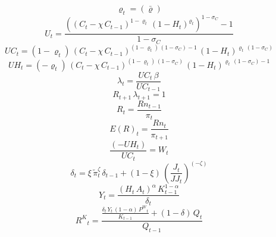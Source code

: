 \begin{dmath}
{{\varrho}}_{t}=(\bar{{\varrho}})
\end{dmath}
\begin{dmath}
{U}_{t}=\frac{\left(\left({C}_{t}-{{\chi}}\, {C}_{t-1}\right)^{1-{{\varrho}}_{t}}\, \left(1-{H}_{t}\right)^{{{\varrho}}_{t}}\right)^{1-{{\sigma_{C}}}}-1}{1-{{\sigma_{C}}}}
\end{dmath}
\begin{dmath}
{UC}_{t}=\left(1-{{\varrho}}_{t}\right)\, \left({C}_{t}-{{\chi}}\, {C}_{t-1}\right)^{\left(1-{{\varrho}}_{t}\right)\, \left(1-{{\sigma_{C}}}\right)-1}\, \left(1-{H}_{t}\right)^{{{\varrho}}_{t}\, \left(1-{{\sigma_{C}}}\right)}
\end{dmath}
\begin{dmath}
{UH}_{t}=\left(-{{\varrho}}_{t}\right)\, \left({C}_{t}-{{\chi}}\, {C}_{t-1}\right)^{\left(1-{{\varrho}}_{t}\right)\, \left(1-{{\sigma_{C}}}\right)}\, \left(1-{H}_{t}\right)^{{{\varrho}}_{t}\, \left(1-{{\sigma_{C}}}\right)-1}
\end{dmath}
\begin{dmath}
{\lambda}_{t}=\frac{{UC}_{t}\, {{\beta}}}{{UC}_{t-1}}
\end{dmath}
\begin{dmath}
{R}_{t+1}\, {\lambda}_{t+1}=1
\end{dmath}
\begin{dmath}
{R}_{t}=\frac{{Rn}_{t-1}}{{\pi}_{t}}
\end{dmath}
\begin{dmath}
{E(R)}_{t}=\frac{{Rn}_{t}}{{\pi}_{t+1}}
\end{dmath}
\begin{dmath}
\frac{\left(-{UH}_{t}\right)}{{UC}_{t}}={W}_{t}
\end{dmath}
\begin{dmath}
{\delta}_{t}={{\xi}}\, {\tilde{\pi}}_{t}^{{{\zeta}}}\, {\delta}_{t-1}+\left(1-{{\xi}}\right)\, \left(\frac{{J}_{t}}{{JJ}_{t}}\right)^{\left(-{{\zeta}}\right)}
\end{dmath}
\begin{dmath}
{Y}_{t}=\frac{\left({H}_{t}\, {A}_{t}\right)^{{{\alpha}}}\, {K}_{t-1}^{1-{{\alpha}}}}{{\delta}_{t}}
\end{dmath}
\begin{dmath}
{R^{K}}_{t}=\frac{\frac{{\delta}_{t}\, {Y}_{t}\, \left(1-{{\alpha}}\right)\, {P^{W}}_{t}}{{K}_{t-1}}+\left(1-{{\delta}}\right)\, {Q}_{t}}{{Q}_{t-1}}
\end{dmath}

